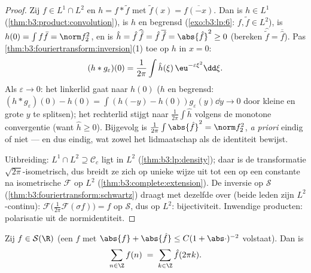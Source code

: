 \begin{proof}
Zij $f \in L^1\cap L^2$ en $h = f * \tilde f$ met $\tilde f(x) =
\overline{f(-x)}$. Dan is $h \in L^1$
(\cref{thm:b3:product:convolution}), is $h$  en begrensd
(\cref{exo:b3:lp:6}: $f, \tilde f \in L^2$), is $h(0) = \int f\bar
f = \norm f_2^2$, en is $\hat h = \hat f\,\widehat{\tilde f} =
\hat f\,\overline{\hat f} = \abs{\hat f}^2 \geq 0$ (bereken
$\widehat{\tilde f} = \overline{\hat f}$). Pas
\cref{thm:b3:fouriertransform:inversion}(1) toe op $h$ in $x =
0$:
\[
(h * g_\varepsilon)(0) = \frac1{2\pi}\int \hat
h(\xi)\,\eu^{-\varepsilon\xi^2}\dd\xi .
\]
Als $\varepsilon \to 0$: het linkerlid gaat naar $h(0)$ ($h$
 en begrensd: $(h*g_\varepsilon)(0) - h(0) = \int(h(-y) -
h(0))g_\varepsilon(y)\dd y \to 0$ door kleine en grote $y$ te
splitsen); het rechterlid stijgt naar $\frac1{2\pi}\int\hat h$
volgens de monotone convergentie (want $\hat h \geq 0$).
Bijgevolg is $\frac1{2\pi}\int\abs{\hat f}^2 = \norm f_2^2$,
\emph{a priori} eindig of niet --- en dus eindig, wat zowel het
lidmaatschap als de identiteit bewijst.

Uitbreiding: $L^1\cap L^2 \supseteq \mathcal C_c$ ligt  in
$L^2$ (\cref{thm:b3:lp:density}); daar is de transformatie
$\sqrt{2\pi}$-isometrisch, dus breidt ze zich op unieke wijze uit
tot een op een constante na isometrische $\mathcal F$ op $L^2$
(\cref{thm:b3:complete:extension}). De inversie op $\mathcal S$
(\cref{thm:b3:fouriertransform:schwartz}) draagt met dezelfde
 over (beide leden zijn $L^2$-continu): $\mathcal
F\bigl(\frac1{2\pi}\mathcal F(\sigma f)\bigr) = f$ op $\mathcal
S$, dus op $L^2$: bijectiviteit. Inwendige producten: polarisatie
uit de normidentiteit.
\end{proof}

\begin{theorem}
\label{thm:b3:fouriertransform:poisson}
Zij $f \in \mathcal S(\R)$ (een  $f$ met $\abs{f} +
\abs{\hat f} \leq C(1 + \abs\cdot)^{-2}$ volstaat). Dan
is
\[
\sum_{n\in\Z} f(n) \;=\; \sum_{k\in\Z}\hat f(2\pi k) .
\]
\end{theorem}

